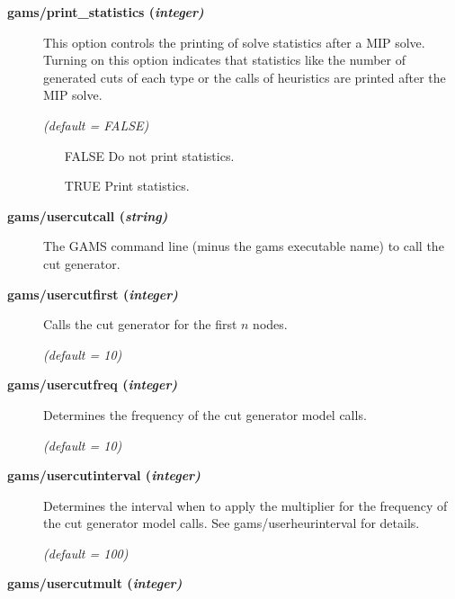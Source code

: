 \begin{description}
\item[\label{scipprintstat}\hypertarget{scipprintstat}
{\textbf{gams/print\_statistics (\slshape{integer})}}]\hspace{1.0in}

This option controls the printing of solve statistics after a MIP solve.
Turning on this option indicates that statistics like the number of
generated cuts of each type or the calls of heuristics are printed after the
MIP solve.

\textsl{(default = FALSE)}
\begin{itemize}
\item[FALSE] Do not print statistics.
\item[TRUE] Print statistics.
\end{itemize}


\item[\label{scipusercutcall}\hypertarget{scipusercutcall}
{\textbf{gams/usercutcall (\slshape{string})}}]\hspace{1.0in}

The GAMS command line (minus the gams executable name) to call the cut generator.


\item[\label{scipusercutfirst}\hypertarget{scipusercutfirst}
{\textbf{gams/usercutfirst (\slshape{integer})}}]\hspace{1.0in}

Calls the cut generator for the first $n$ nodes.

\textsl{(default = 10)}

\item[\label{scipusercutfreq}\hypertarget{scipusercutfreq}
{\textbf{gams/usercutfreq (\slshape{integer})}}]\hspace{1.0in}

Determines the frequency of the cut generator model calls.

\textsl{(default = 10)}

\item[\label{scipusercutinterval}\hypertarget{scipusercutinterval}
{\textbf{gams/usercutinterval (\slshape{integer})}}]\hspace{1.0in}

Determines the interval when to apply the multiplier for the frequency of the cut generator model calls.
See gams/userheurinterval for details.

\textsl{(default = 100)}

\item[\label{scipusercutmult}\hypertarget{scipusercutmult}
{\textbf{gams/usercutmult (\slshape{integer})}}]\hspace{1.0in}


\end{description}
